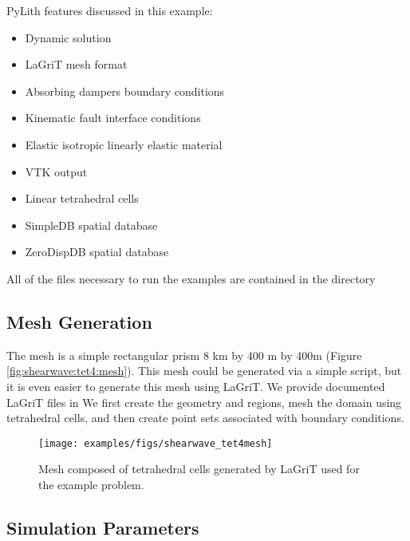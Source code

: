 PyLith features discussed in this example:
\begin{itemize}
\item Dynamic solution
\item LaGriT mesh format
\item Absorbing dampers boundary conditions
\item Kinematic fault interface conditions
\item Elastic isotropic linearly elastic material
\item VTK output
\item Linear tetrahedral cells
\item SimpleDB spatial database
\item ZeroDispDB spatial database
\end{itemize}
All of the files necessary to run the examples are contained in the
directory 


\subsection{Mesh Generation}

The mesh is a simple rectangular prism 8 km by 400 m by 400m (Figure
\vref{fig:shearwave:tet4:mesh}). This mesh could be generated via
a simple script, but it is even easier to generate this mesh using
LaGriT. We provide documented LaGriT files in 
We first create the geometry and regions, mesh the domain using tetrahedral
cells, and then create point sets associated with boundary conditions.

\begin{figure}
  \texttt{[image: examples/figs/shearwave\_tet4mesh]}
  \caption{Mesh composed of tetrahedral cells generated by LaGriT used for the
    example problem.}
  \label{fig:shearwave:tet4:mesh}
\end{figure}


\subsection{Simulation Parameters}

